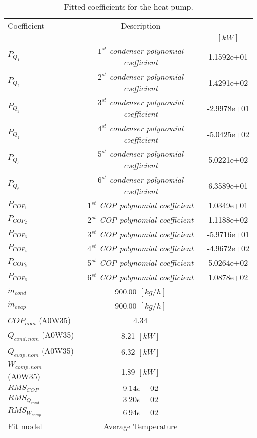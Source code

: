 \documentclass[english]{SPFShortReport}
\author{Dani Carbonell}
\begin{document}
\begin{table}[!ht]
\begin{small}
\caption{Fitted coefficients for the heat pump.}
\begin{center}
\resizebox{12cm}{!} 
{
\begin{tabular}{l | c c } 
\hline
\hline
Coefficient &Description & \\ 
 & &$[kW]$\\ 
\hline
$P_{Q_{1}}$ & \emph{$1^{st}$ condenser polynomial coefficient}  & 1.1592e+01    \\ 
$P_{Q_{2}}$ & \emph{$2^{st}$ condenser polynomial coefficient}  & 1.4291e+02    \\ 
$P_{Q_{3}}$ & \emph{$3^{st}$ condenser polynomial coefficient}  & -2.9978e+01    \\ 
$P_{Q_{4}}$ & \emph{$4^{st}$ condenser polynomial coefficient}  & -5.0425e+02    \\ 
$P_{Q_{5}}$ & \emph{$5^{st}$ condenser polynomial coefficient}  & 5.0221e+02    \\ 
$P_{Q_{6}}$ & \emph{$6^{st}$ condenser polynomial coefficient}  & 6.3589e+01    \\ 
\hline
$P_{COP_{1}}$ & \emph{$1^{st}$ COP polynomial coefficient}  & 1.0349e+01    \\ 
$P_{COP_{2}}$ & \emph{$2^{st}$ COP polynomial coefficient}  & 1.1188e+02    \\ 
$P_{COP_{3}}$ & \emph{$3^{st}$ COP polynomial coefficient}  & -5.9716e+01    \\ 
$P_{COP_{4}}$ & \emph{$4^{st}$ COP polynomial coefficient}  & -4.9672e+02    \\ 
$P_{COP_{5}}$ & \emph{$5^{st}$ COP polynomial coefficient}  & 5.0264e+02    \\ 
$P_{COP_{6}}$ & \emph{$6^{st}$ COP polynomial coefficient}  & 1.0878e+02    \\ 
\hline
$\dot m_{cond}$ & 900.00 $[kg/h]$ \\ 
$\dot m_{evap}$ & 900.00 $[kg/h]$ \\ 
\hline
$COP_{nom}$ (A0W35)& 4.34 \\ 
$Q_{cond,nom}$ (A0W35)& 8.21 $[kW]$\\ 
$Q_{evap,nom}$ (A0W35)& 6.32 $[kW]$\\ 
$W_{comp,nom}$ (A0W35)& 1.89 $[kW]$\\ 
\hline
 $RMS_{COP}$ & $9.14e-02$ \\ 
 $RMS_{Q_{cond}}$ & $3.20e-02$ \\ 
 $RMS_{W_{comp}}$ & $6.94e-02$ \\ 
\hline
Fit model & Average Temperature\\ 
\hline
\hline
\end{tabular}
}
\label{CoefTable}
\end{center}
\end{small}
\end{table}
\end{document}
